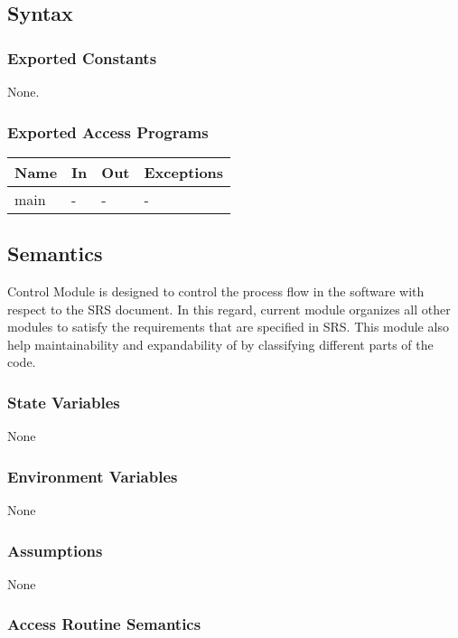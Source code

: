 \documentclass[12pt, titlepage]{article}
\begin{document}
	\subsection{Syntax}
	
	\subsubsection{Exported Constants} None. \subsubsection{Exported Access
		Programs}
	
	\begin{center} \begin{tabular}{p{2cm} p{4cm} p{4cm} p{2cm}} \hline \textbf{Name}
			& \textbf{In} & \textbf{Out} & \textbf{Exceptions} \\ \hline main & - & - & - \\
			\hline \end{tabular} \end{center}
	
	\subsection{Semantics} \progname{} Control Module is designed to control the
	process flow in the software with respect to the SRS document. In this regard, current module organizes all other modules to satisfy the requirements that are specified in
	SRS. This module also help maintainability and expandability of \progname{} by
	classifying different parts of the code.
	
	\subsubsection{State Variables}
	
	None
	
	\subsubsection{Environment Variables}
	
	None
	
	\subsubsection{Assumptions}
	
	None
	
	\subsubsection{Access Routine Semantics}
	
\end{document}
